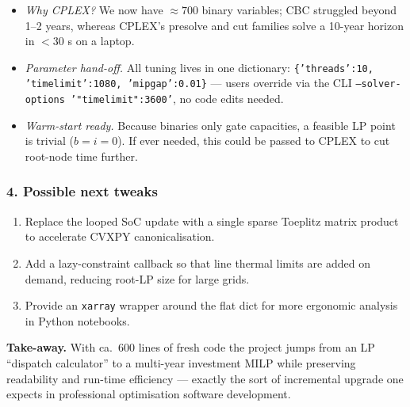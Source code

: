 \begin{itemize}
    \item \emph{Why CPLEX?}  We now have \(\approx 700\) binary variables; CBC struggled beyond 1–2 years,
          whereas CPLEX’s presolve and cut families solve a 10-year horizon in \(< 30\) s on a laptop.
    \item \emph{Parameter hand-off.}  All tuning lives in one dictionary:  
          \texttt{\{'threads':10, 'timelimit':1080, 'mipgap':0.01\}} — users override via the CLI
          \texttt{--solver-options '{"timelimit":3600}'}, no code edits needed.
    \item \emph{Warm-start ready.}  Because binaries only gate capacities, a feasible LP point is trivial
          (\(b=i=0\)).  If ever needed, this could be passed to CPLEX to cut root-node time further.
\end{itemize}

\subsubsection*{4.  Possible next tweaks}

\begin{enumerate}[label=\alph*)]
    \item Replace the looped SoC update with a single sparse Toeplitz matrix product to
          accelerate CVXPY canonicalisation.  
    \item Add a lazy-constraint callback so that line thermal limits are added on
          demand, reducing root-LP size for large grids.  
    \item Provide an \texttt{xarray} wrapper around the flat dict for more ergonomic
          analysis in Python notebooks.
\end{enumerate}

\vspace{0.5em}
\noindent
\textbf{Take-away.}  
With ca.~600 lines of fresh code the project jumps from an LP “dispatch calculator” to a
multi-year investment MILP while preserving readability and run-time efficiency —
exactly the sort of incremental upgrade one expects in professional optimisation
software development.